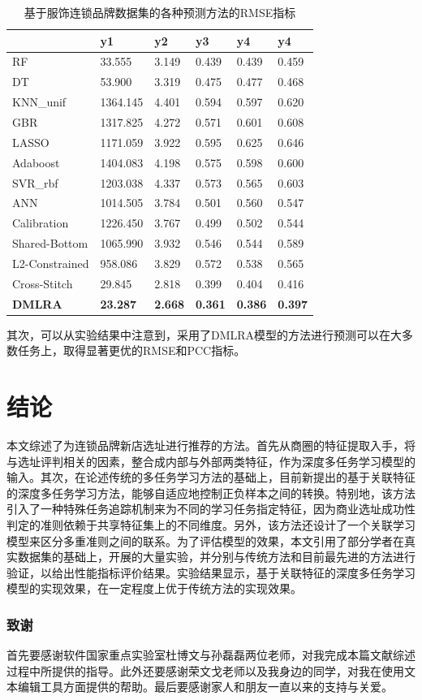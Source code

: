 \documentclass{llncs}
\begin{document}
\begin{table}[!hpt]
	\centering
	\caption{基于服饰连锁品牌数据集的各种预测方法的RMSE指标}
	\label{tb:RMSEfushi}
	\begin{tabular}{p{3cm}<{\centering}p{1.6cm}<{\centering}p{1.6cm}<{\centering}p{1.6cm}<{\centering}p{1.6cm}<{\centering}p{1.6cm}<{\centering}}
		\hline
		& \textbf{y1} & \textbf{y2} & \textbf{y3} & \textbf{y4} & \textbf{y4} \\ \hline
		RF & 33.555 & 3.149 & 0.439 & 0.439 & 0.459 \\ %
		DT & 53.900 & 3.319 & 0.475 & 0.477 & 0.468 \\ %
		KNN\_unif & 1364.145 & 4.401 & 0.594 & 0.597 & 0.620 \\ %
		GBR & 1317.825 & 4.272 & 0.571 & 0.601 & 0.608 \\ %
		LASSO & 1171.059 & 3.922 & 0.595 & 0.625 & 0.646 \\ %
		Adaboost & 1404.083 & 4.198 & 0.575 & 0.598 & 0.600 \\ %
		SVR\_rbf & 1203.038 & 4.337 & 0.573 & 0.565 & 0.603 \\ %
		ANN & 1014.505 & 3.784 & 0.501 & 0.560 & 0.547 \\ \hline
		Calibration & 1226.450 & 3.767 & 0.499 & 0.502 & 0.544 \\ %
		Shared-Bottom & 1065.990 & 3.932 & 0.546 & 0.544 & 0.589 \\ %
		L2-Constrained & 958.086 & 3.829 & 0.572 & 0.538 & 0.565 \\ %
		Cross-Stitch & 29.845 & 2.818 & 0.399 & 0.404 & 0.416 \\ \hline
		\textbf{DMLRA} & \textbf{23.287} & \textbf{2.668} & \textbf{0.361} & \textbf{0.386} & \textbf{0.397}                 \\ \hline
	\end{tabular}
\end{table}

其次，可以从实验结果中注意到，采用了DMLRA模型的方法进行预测可以在大多数任务上，取得显著更优的RMSE和PCC指标。


\section{结论}
本文综述了为连锁品牌新店选址进行推荐的方法。首先从商圈的特征提取入手，将与选址评判相关的因素，整合成内部与外部两类特征，作为深度多任务学习模型的输入。其次，在论述传统的多任务学习方法的基础上，目前新提出的基于关联特征的深度多任务学习方法，能够自适应地控制正负样本之间的转换。特别地，该方法引入了一种特殊任务追踪机制来为不同的学习任务指定特征，因为商业选址成功性判定的准则依赖于共享特征集上的不同维度。另外，该方法还设计了一个关联学习模型来区分多重准则之间的联系。为了评估模型的效果，本文引用了部分学者在真实数据集的基础上，开展的大量实验，并分别与传统方法和目前最先进的方法进行验证，以给出性能指标评价结果。实验结果显示，基于关联特征的深度多任务学习模型的实现效果，在一定程度上优于传统方法的实现效果。


\subsubsection*{致谢}
首先要感谢软件国家重点实验室杜博文与孙磊磊两位老师，对我完成本篇文献综述过程中所提供的指导。此外还要感谢荣文戈老师以及我身边的同学，对我在使用文本编辑工具方面提供的帮助。最后要感谢家人和朋友一直以来的支持与关爱。


%

	
\end{document}
